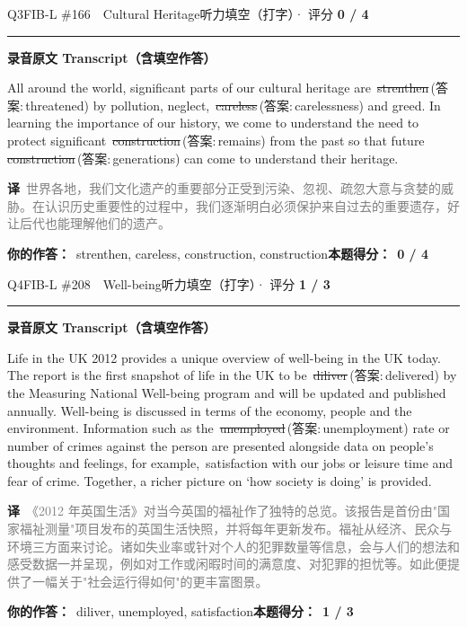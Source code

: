 \documentclass[11pt]{article}
\newcommand{\ptesub}[1]{%
  \par\needspace{2\baselineskip}\smallskip
  {\color{cAccent}\rule[-0.2ex]{3pt}{1.05em}}\hspace{6pt}%
  {\bfseries\color{cHead}#1}\par\nopagebreak\smallskip}
\newcommand{\zh}[1]{{\footnotesize\textcolor{cNote}{\textbf{译}}\ \textcolor{gray}{#1}}}
\newcommand{\rok}[1]{{\color{cFix}\ding{51}\,#1}}                 %
\newcommand{\rno}[2]{{\color{cWrong}\ding{55}\,\sout{#1}}\,{\footnotesize\color{cFix}(答案:\,#2)}}  %
\begin{document}
\begin{qblock}{Q3\quad FIB-L \#166\ \ Cultural Heritage}{听力填空（打字）· 评分 \textcolor{cAccent}{\bfseries 0 / 4}}
\ptesub{录音原文 Transcript（含填空作答）}
\begin{promptbox}
All around the world, significant parts of our cultural heritage are \rno{strenthen}{threatened} by pollution, neglect, \rno{careless}{carelessness} and greed. In learning the importance of our history, we come to understand the need to protect significant \rno{construction}{remains} from the past so that future \rno{construction}{generations} can come to understand their heritage.
\end{promptbox}
\zh{世界各地，我们文化遗产的重要部分正受到污染、忽视、疏忽大意与贪婪的威胁。在认识历史重要性的过程中，我们逐渐明白必须保护来自过去的重要遗存，好让后代也能理解他们的遗产。}
\par\smallskip
\textbf{你的作答：}\ {\color{cWrong}strenthen, careless, construction, construction}\qquad\textbf{本题得分：}\ {\color{cAccent}\bfseries 0 / 4}
\end{qblock}

\begin{qblock}{Q4\quad FIB-L \#208\ \ Well-being}{听力填空（打字）· 评分 \textcolor{cAccent}{\bfseries 1 / 3}}
\ptesub{录音原文 Transcript（含填空作答）}
\begin{promptbox}
Life in the UK 2012 provides a unique overview of well-being in the UK today. The report is the first snapshot of life in the UK to be \rno{diliver}{delivered} by the Measuring National Well-being program and will be updated and published annually. Well-being is discussed in terms of the economy, people and the environment. Information such as the \rno{unemployed}{unemployment} rate or number of crimes against the person are presented alongside data on people's thoughts and feelings, for example, \rok{satisfaction} with our jobs or leisure time and fear of crime. Together, a richer picture on `how society is doing' is provided.
\end{promptbox}
\zh{《2012 年英国生活》对当今英国的福祉作了独特的总览。该报告是首份由"国家福祉测量"项目发布的英国生活快照，并将每年更新发布。福祉从经济、民众与环境三方面来讨论。诸如失业率或针对个人的犯罪数量等信息，会与人们的想法和感受数据一并呈现，例如对工作或闲暇时间的满意度、对犯罪的担忧等。如此便提供了一幅关于"社会运行得如何"的更丰富图景。}
\par\smallskip
\textbf{你的作答：}\ {\color{cWrong}diliver}, {\color{cWrong}unemployed}, satisfaction\qquad\textbf{本题得分：}\ {\color{cAccent}\bfseries 1 / 3}
\end{qblock}
\end{document}
